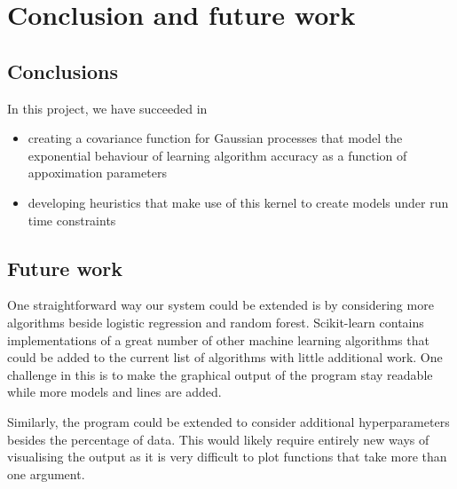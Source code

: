 \documentclass[a4paper,12pt,twoside,openright]{report}
\begin{document}
\chapter{Conclusion and future work} 
\section{Conclusions}
In this project, we have succeeded in
\begin{itemize}
	\item creating a covariance function for Gaussian processes that model the exponential behaviour of learning algorithm accuracy as a function of appoximation parameters
	\item developing heuristics that make use of this kernel to create models under run time constraints
\end{itemize}


\section{Future work}
One straightforward way our system could be extended is by considering more algorithms beside logistic regression and random forest. Scikit-learn contains implementations of a great number of other machine learning algorithms that could be added to the current list of algorithms with little additional work. One challenge in this is to make the graphical output of the program stay readable while more models and lines are added.

Similarly, the program could be extended to consider additional hyperparameters besides the percentage of data. This would likely require entirely new ways of visualising the output as it is very difficult to plot functions that take more than one argument.






\appendix
\singlespacing

 

\end{document}

